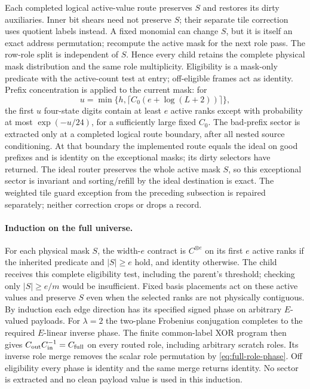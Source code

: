 Each completed logical active-value route preserves $S$ and restores
its dirty auxiliaries. Inner bit shears need not preserve $S$; their
separate tile correction uses quotient labels instead. A fixed monomial
can change $S$, but it is itself an exact
address permutation; recompute the active mask for the next role pass.
The row-role split is independent of $S$.  Hence every child retains the
complete physical mask distribution and the same role multiplicity.
Eligibility is a mask-only predicate with the active-count test at
entry; off-eligible frames act as identity. Prefix concentration is applied to the current
mask: for
\[
 u=\min\{h,\lceil C_0(e+\log(L+2))\rceil\},
\]
the first $u$ four-state digits contain at least $e$ active ranks except
with probability at most $\exp(-u/24)$, for a sufficiently large fixed
$C_0$. The bad-prefix sector is extracted only at a completed logical
route boundary, after all nested source conditioning. At that boundary
the implemented route equals the ideal on good prefixes and is identity
on the exceptional masks; its dirty selectors have returned. The
ideal router preserves the whole active mask $S$, so this exceptional
sector is invariant and sorting/refill by the ideal destination is
exact. The weighted
tile guard exception from the preceding subsection is repaired separately;
neither correction crops or drops a record.

\paragraph{Induction on the full universe.}
For each physical mask $S$, the width-$e$ contract is
$C^{\otimes e}$ on its first $e$ active ranks if the inherited predicate
and $|S|\ge e$ hold, and identity otherwise. The child receives this
complete eligibility test, including the parent's threshold; checking
only $|S|\ge e/m$ would be insufficient. Fixed basis placements act on
these active values and preserve $S$ even when the selected ranks are
not physically contiguous. By induction each edge direction has its
specified signed phase on arbitrary $E$-valued payloads. For
$\lambda=2$ the two-plane Frobenius conjugation completes to the required
$E$-linear inverse phase. The finite common-label XOR program then gives
$C_{\rm out}C_{\rm in}^{-1}=C_{\rm full}$ on every routed role,
including arbitrary scratch roles. Its inverse role merge removes the
scalar role permutation by \eqref{eq:full-role-phase}.
Off eligibility every phase is identity and
the same merge returns identity. No sector is extracted and no clean
payload value is used in this induction.

